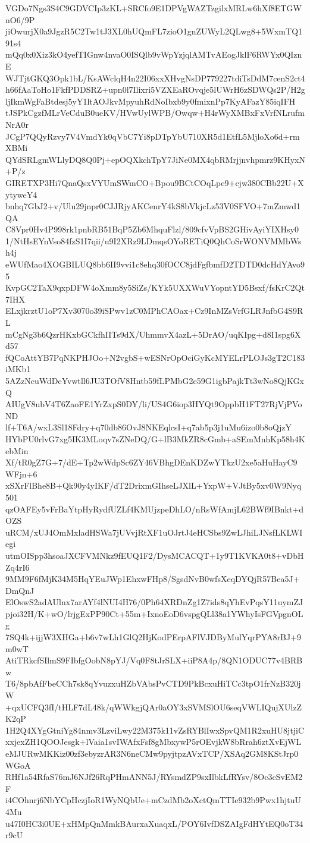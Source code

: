 VGDo7Ngs3S4C9GDVCIp3zKL+SRCfo9E1DPVgWAZTzgilxMRLw6hXf8ETGWnO6/9P
jiOwurjX0a9JgzR5C2Tw1tJ3XL0hUQmFL7zioO1gnZUWyL2QLwg8+5WxmTQ191s4
mQq0x0Xiz3kO4yefTIGnw4nvaO0ISQlb9vWpYzjqlAMTvAEogJklF6RWYx0QIznE
WJTjtGKQ3Opk1bL/KsAWclqH4n22I06xxXHvgNsDP779227tdiTsDdM7cenS2ct4
h66fAaToHo1FkfPDDSRZ+upn0l7Ilixri5VZXEaROvqje5lUWrH6zSDWQs2P/H2g
ljIkmWgFaBtdesj5yY1ltAOJkvMpyuhRdNoIbxb9y0fmixnPp7KyAFazY85iqIFH
tJSPkCgzfMLrVeCduB0ueKV/HVwUylWPB/Owqw+H4rWyXMBxFxVrfNLrufmNrA0r
JCgP7QQyRzvy7V4VmdYk0qVbC7Yi8pDTpYbU710XR5d1EtfL5MjloXo6d+rmXBMi
QYdSRLgmWLlyDQ8Q0Pj+epOQXkchTpY7JiNe0MX4qbRMrjjnvhpmrz9KHyxN+P/z
GIRETXP3Hi7QnaQsxVYUmSWmCO+Bpou9BCtCOqLpe9+cjw380CBb22U+XytyweY4
bnhq7GbJ2+v/Ulu29jnpr0CJJRjyAKCenrY4kS8bVkjcLz53V0SFVO+7mZmwd1QA
C8Vpr0Hv4P998rk1pnbRB51BqP5Zb6MhquFlzl/809cfvVpBS2GHivAyiYIXHsy0
1/NtHsEYnVso84fzS1I7qii/u9I2XRz9LDmqsOYoRETiQ0QhCoSrWONVMMbWsh4j
eWUfMao4XOGBILUQ8bb6II9vvi1c8ehq30fOCC8jdFgfbmfD2TDTD0dcHdYAvo95
KvpGC2TaX9qxpDFW4oXmm8y5SiZs/KYk5UXXWuVYopntYD5Bsxf/fsKrC2Qt7IHX
ELxjkrztU1oP7Xv3070o39iSPwv1zC0MPhCAOax+Cz9InMZsVrfGLRJnfbG4S9RL
mCgNg3b6QzrHKxbGCkfhIITs9dX/UhmmvX4azL+5DrAO/uqKIpg+d8I1spg6Xd57
fQCoAttYB7PqNKPHJOo+N2vgbS+wESNrOpOciGyKcMYELrPLOJs3gT2C183iMKb1
5AZzNcuWdDeYvwtll6JU3TOfV8Hntb59fLPMbG2e59G1igbPajkTt3wNo8QjKGxQ
AIUgV8ubV4T6ZaoFE1YrZxpS0DY/li/US4G6iop3HYQt9OppbH1FT27RjVjPVoND
lf+T6A/wxL3Sl18Fdry+q70db86OvJ8NKEqlcsI+q7ab5p3j1uMu6izo0b8oQjzY
HYbPU0rlvG7xg5IK3MLoqv7sZNeDQ/G+lB3MkZR8cGmb+aSEmMnhKp58h4KebMin
Xf/tR0gZ7G+7/dE+Tp2wWdpSc6ZY46VBhgDEnKDZwYTkzU2xe5aHuHayC9WFjn+6
xSXrFlBhe8B+Qk90y4yIKF/dT2DrixmGIhseLJXlL+YxpW+VJtBy5xv0W9Nyq501
qzOAFEy5vFrBaYtpHyRydfUZLf4KMUjzpeDhLO/nRsWfAmjL62BWf9IBnkt+dOZS
uRCM/xUJ4OmMxladHSWa7jUVvjRtXF1uOJrtJ4eHCSbs9ZwLJhiLJNsfLKLWIegi
utmOISpp3hsoaJXCFVMNkz9fEUQ1F2/DysMCACQT+1y9T1KVKA0t8+vDbHZq4rI6
9MM9F6fMjK34M5HqYEuJWp1EhxwFHp8/SgsdNvB0wfsXeqDYQjR57Bea5J+DmQnJ
ElOswS2adAUlnx7arAYf4lNUI4H76/0Ph64XRDnZg1Z7ids8qYhEvPqsY11uymZJ
pjoi32H/K+wO/lrjgExPP90Ct+55m+IxnoEoD6vspgQLl38a1YWhyIsFGVpgnOLg
7SQ4k+ijjW3XHGa+b6v7wLh1GlQ2HjKodPErpAFlVJDByMulYqrPYA8rBJ+9m0wT
AtiTRkcfSIlmS9FIbfgOobN8pYJ/Vq0F8tJrSLX+iiP8A4p/8QN1ODUC77v4BRBw
T6/8pbAfFbeCCh7sk8qYvuzxuHZbVAbsPvCTD9PkBcxuHiTCc3tpO1frNzB320jW
+qxUCFQ3fI/tHLF7dL48k/qWWkgjQAr0aOY3xSVMSlOU6seqVWLIQujXUlzZK2qP
1H2Q4XYgGtniYg84nmv3LzviLwy22M375k11vZsRYBlIwxSpvQM1R2xuHU8jtjiC
xxjexZH1QOOJesgk+lVaia1svIWAfxFsf8gMbxywP5rOEvjkW8bRrah6ztXvEjWL
eMJURwMKKiz00zf3ebyzrAR3N6neCMw9pyjtpzAVxTCP/XSAq2GM8KStJrp0WGoA
RHf1a54RfaS76mJ6NJf26RqPHmANN5J/RYsmdZP9sxIlbkLfRYsv/8Oc3cSvEM2F
i4COhnrj6NbYCpHczjIoR1WyNQbUe+mCzdMb2oXctQmTTIe932b9Pwx1hjtuU4Mu
u47I0HC3i0UE+xHMpQnMmkBAurxaXuaqxL/POY6IvfDSZAIgFdHYtEQ0oT34r9cU
